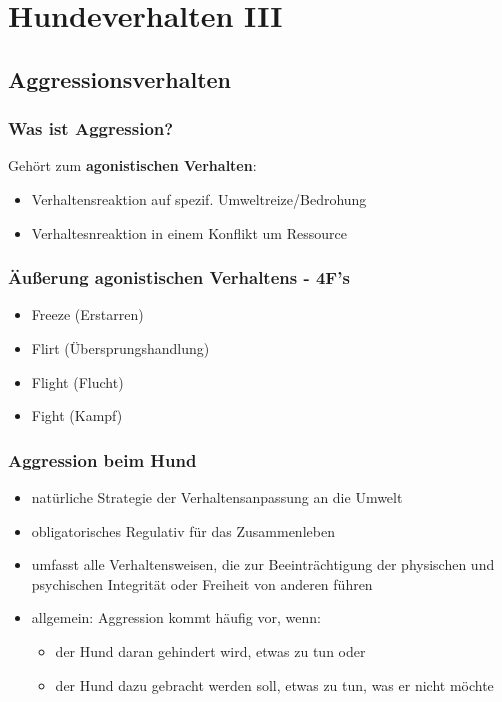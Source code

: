 \chapter{Hundeverhalten III}


\section{Aggressionsverhalten}
    \subsection{Was ist Aggression?}
    Gehört zum \textbf{agonistischen Verhalten}:
    \begin{itemize}
        \item Verhaltensreaktion auf spezif. Umweltreize/Bedrohung
        \item Verhaltesnreaktion in einem Konflikt um Ressource
    \end{itemize}

    \subsection{Äußerung agonistischen Verhaltens - 4F's}
    \begin{itemize}
        \item Freeze (Erstarren)
        \item Flirt (Übersprungshandlung)
        \item Flight (Flucht)
        \item Fight (Kampf)
    \end{itemize}

    \subsection{Aggression beim Hund}
    \begin{itemize}
        \item natürliche Strategie der Verhaltensanpassung an die Umwelt
        \item obligatorisches Regulativ für das Zusammenleben
        \item umfasst alle Verhaltensweisen, die zur Beeinträchtigung der physischen und psychischen Integrität oder Freiheit von anderen führen
        \item allgemein: Aggression kommt häufig vor, wenn:
        \begin{itemize}
            \item der Hund daran gehindert wird, etwas zu tun oder
            \item der Hund dazu gebracht werden soll, etwas zu tun, was er nicht möchte
        \end{itemize}
    \end{itemize}


